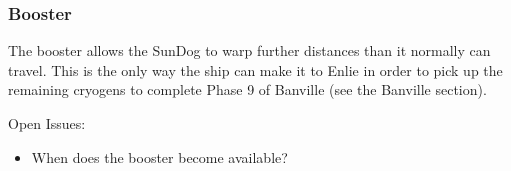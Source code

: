 \subsubsection{Booster}

The booster allows the SunDog to warp further distances than it normally
can travel.  This is the only way the ship can make it to Enlie in order
to pick up the remaining cryogens to complete Phase 9 of Banville (see the
Banville section).

Open Issues:
\begin{itemize}
\item When does the booster become available?
\end{itemize}



